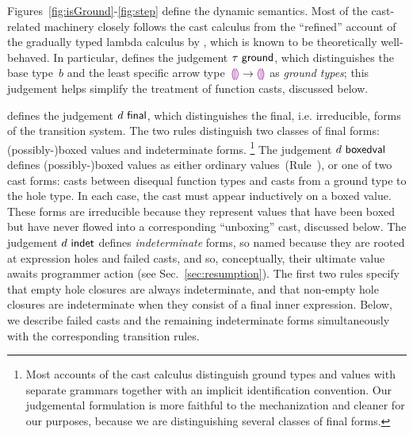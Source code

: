 Figures~\ref{fig:isGround}-\ref{fig:step} define the dynamic semantics.
%
Most of the cast-related machinery closely follows the cast calculus from
the ``refined'' account of the gradually typed lambda calculus
by \citet{DBLP:conf/snapl/SiekVCB15}, which is known to be
theoretically well-behaved.
%
In particular,  defines the judgement
$\tau~\mathsf{ground}$, which distinguishes the base type~$b$ and the
least specific arrow type~$\textcolor{violet}{\llparenthesis}\textcolor{violet}{\rrparenthesis} \rightarrow \textcolor{violet}{\llparenthesis}\textcolor{violet}{\rrparenthesis}$ as \emph{ground
types}; this judgement helps simplify the treatment of function casts, discussed below.

%
 defines the judgement $d~\mathsf{final}$, which
distinguishes the final, i.e. irreducible, forms of the transition system.
%
The two rules distinguish two classes of final forms: (possibly-)boxed values and
indeterminate forms.%
%
\footnote{
        Most accounts of the cast calculus distinguish ground types and values
        with separate grammars together with an
        implicit identification convention.
        Our judgemental formulation is more faithful to the mechanization and
        cleaner for our purposes, because we are distinguishing several
        classes of final forms.
}
The judgement $d~\mathsf{boxedval}$ defines (possibly-)boxed values as
either ordinary values~(Rule~), or one of two cast forms: casts
between disequal function types and casts from a ground
type to the hole type. In each case, the cast must appear inductively on a boxed
value.
These forms are irreducible because they represent values that have been boxed
but have never flowed into a corresponding ``unboxing'' cast, discussed below.
%
%
The judgement $d~\mathsf{indet}$ defines \emph{indeterminate} forms, so
named because they are rooted at expression holes and
failed casts, and so, conceptually, their ultimate value
awaits programmer action (see Sec.~\ref{sec:resumption}).
%
The first two rules specify that {empty} hole closures are always
indeterminate, and that {non}-empty hole closures are indeterminate when
they consist of a {final} inner expression.
%
Below, we describe failed casts and the remaining indeterminate forms simultaneously
with the corresponding transition rules.

